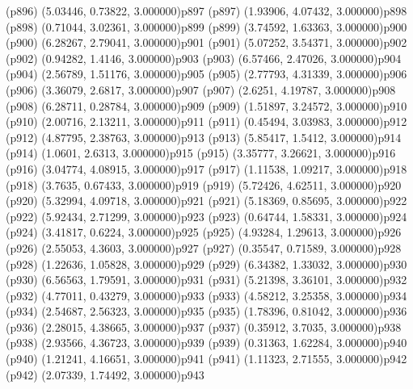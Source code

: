 \psdot(p896)
\psPoint(5.03446, 0.73822, 3.000000){p897}
\psdot(p897)
\psPoint(1.93906, 4.07432, 3.000000){p898}
\psdot(p898)
\psPoint(0.71044, 3.02361, 3.000000){p899}
\psdot(p899)
\psPoint(3.74592, 1.63363, 3.000000){p900}
\psdot(p900)
\psPoint(6.28267, 2.79041, 3.000000){p901}
\psdot(p901)
\psPoint(5.07252, 3.54371, 3.000000){p902}
\psdot(p902)
\psPoint(0.94282, 1.4146, 3.000000){p903}
\psdot(p903)
\psPoint(6.57466, 2.47026, 3.000000){p904}
\psdot(p904)
\psPoint(2.56789, 1.51176, 3.000000){p905}
\psdot(p905)
\psPoint(2.77793, 4.31339, 3.000000){p906}
\psdot(p906)
\psPoint(3.36079, 2.6817, 3.000000){p907}
\psdot(p907)
\psPoint(2.6251, 4.19787, 3.000000){p908}
\psdot(p908)
\psPoint(6.28711, 0.28784, 3.000000){p909}
\psdot(p909)
\psPoint(1.51897, 3.24572, 3.000000){p910}
\psdot(p910)
\psPoint(2.00716, 2.13211, 3.000000){p911}
\psdot(p911)
\psPoint(0.45494, 3.03983, 3.000000){p912}
\psdot(p912)
\psPoint(4.87795, 2.38763, 3.000000){p913}
\psdot(p913)
\psPoint(5.85417, 1.5412, 3.000000){p914}
\psdot(p914)
\psPoint(1.0601, 2.6313, 3.000000){p915}
\psdot(p915)
\psPoint(3.35777, 3.26621, 3.000000){p916}
\psdot(p916)
\psPoint(3.04774, 4.08915, 3.000000){p917}
\psdot(p917)
\psPoint(1.11538, 1.09217, 3.000000){p918}
\psdot(p918)
\psPoint(3.7635, 0.67433, 3.000000){p919}
\psdot(p919)
\psPoint(5.72426, 4.62511, 3.000000){p920}
\psdot(p920)
\psPoint(5.32994, 4.09718, 3.000000){p921}
\psdot(p921)
\psPoint(5.18369, 0.85695, 3.000000){p922}
\psdot(p922)
\psPoint(5.92434, 2.71299, 3.000000){p923}
\psdot(p923)
\psPoint(0.64744, 1.58331, 3.000000){p924}
\psdot(p924)
\psPoint(3.41817, 0.6224, 3.000000){p925}
\psdot(p925)
\psPoint(4.93284, 1.29613, 3.000000){p926}
\psdot(p926)
\psPoint(2.55053, 4.3603, 3.000000){p927}
\psdot(p927)
\psPoint(0.35547, 0.71589, 3.000000){p928}
\psdot(p928)
\psPoint(1.22636, 1.05828, 3.000000){p929}
\psdot(p929)
\psPoint(6.34382, 1.33032, 3.000000){p930}
\psdot(p930)
\psPoint(6.56563, 1.79591, 3.000000){p931}
\psdot(p931)
\psPoint(5.21398, 3.36101, 3.000000){p932}
\psdot(p932)
\psPoint(4.77011, 0.43279, 3.000000){p933}
\psdot(p933)
\psPoint(4.58212, 3.25358, 3.000000){p934}
\psdot(p934)
\psPoint(2.54687, 2.56323, 3.000000){p935}
\psdot(p935)
\psPoint(1.78396, 0.81042, 3.000000){p936}
\psdot(p936)
\psPoint(2.28015, 4.38665, 3.000000){p937}
\psdot(p937)
\psPoint(0.35912, 3.7035, 3.000000){p938}
\psdot(p938)
\psPoint(2.93566, 4.36723, 3.000000){p939}
\psdot(p939)
\psPoint(0.31363, 1.62284, 3.000000){p940}
\psdot(p940)
\psPoint(1.21241, 4.16651, 3.000000){p941}
\psdot(p941)
\psPoint(1.11323, 2.71555, 3.000000){p942}
\psdot(p942)
\psPoint(2.07339, 1.74492, 3.000000){p943}
